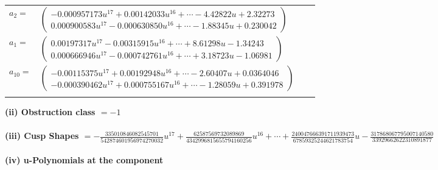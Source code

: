 \documentclass[1p]{elsarticle_modified}
\theoremstyle{definition}
\begin{document}
\begin{tabular}{m{7pt} m{180pt} m{7pt} m{180pt} }
\flushright $a_{2}=$&$\begin{pmatrix}-0.000957173 u^{17}+0.00142033 u^{16}+\cdots-4.42822 u+2.32273\\0.000900583 u^{17}-0.000630850 u^{16}+\cdots-1.88345 u+0.230042\end{pmatrix}$ \\
\flushright $a_{1}=$&$\begin{pmatrix}0.00197317 u^{17}-0.00315915 u^{16}+\cdots+8.61298 u-1.34243\\0.000666946 u^{17}-0.000742761 u^{16}+\cdots+3.18723 u-1.06981\end{pmatrix}$ \\
\flushright $a_{10}=$&$\begin{pmatrix}-0.00115375 u^{17}+0.00192948 u^{16}+\cdots-2.60407 u+0.0364046\\-0.000390462 u^{17}+0.000755167 u^{16}+\cdots-1.28059 u+0.391978\end{pmatrix}$\\&\end{tabular}
\flushleft \textbf{(ii) Obstruction class $= -1$}\\~\\
\flushleft \textbf{(iii) Cusp Shapes $= -\frac{335010846082545701}{542874601956974270032} u^{17}+\frac{62587569732089869}{4342996815655794160256} u^{16}+\cdots+\frac{240047666391711939473}{67859325244621783754} u-\frac{317868067795007140580}{33929662622310891877}$}\\~\\
\newpage\renewcommand{\arraystretch}{1}
\flushleft \textbf{(iv) u-Polynomials at the component}\newline \\
\end{document}
